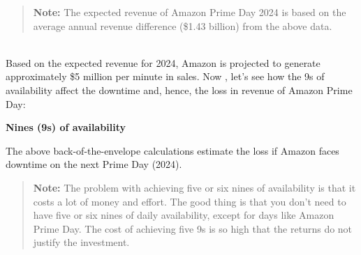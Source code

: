 \begin{quote}
\textbf{Note:} The expected revenue of Amazon Prime Day 2024 is based on the average annual revenue difference (\$1.43 billion) from the above data.
\end{quote}
\\
Based on the expected revenue for 2024, Amazon is projected to generate approximately \$5 million per minute in sales. Now , let's see how the 9s of availability affect the downtime and, hence, the loss in revenue of Amazon Prime Day:

\textbf{Nines (9s) of availability}

\begin{table}[htbp]
\centering
\small
{}
\caption{Nines (9s) of availability}
\end{table}

The above back-of-the-envelope calculations estimate the loss if Amazon faces downtime on the next Prime Day (2024).
\begin{quote}
\textbf{Note:} The problem with achieving five or six nines of availability is that it costs a lot of money and effort. The good thing is that you don't need to have five or six nines of daily availability, except for days like Amazon Prime Day. The cost of achieving five 9s is so high that the returns do not justify the investment.
\end{quote}
